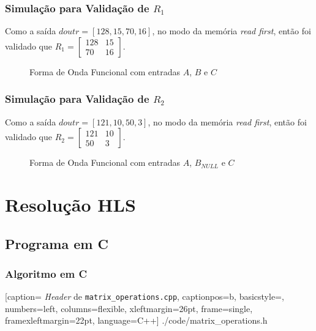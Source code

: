 \documentclass{beamer}
\begin{document}
    \begin{frame}
        \frametitle{Simulação para Validação de $ R_1 $}

        \begingroup {}
            Como a saída $ doutr = [128, 15, 70, 16] $, 
            no modo da memória \textit{read first}, então
            foi validado que $ R_1 = \begin{bmatrix} 128 & 15 \\ 70 & 16 \end{bmatrix} $.
        \endgroup

        \begin{figure}[h] 
            \centering
            \caption{\label{img:pc-po-simulation-1} Forma de Onda Funcional com entradas $ A $, $ B $ e $ C $}
          \end{figure}
    \end{frame}

    \begin{frame}
        \frametitle{Simulação para Validação de $ R_2 $}

        \begingroup {}
            Como a saída $ doutr = [121, 10, 50, 3] $, 
            no modo da memória \textit{read first}, então
            foi validado que $ R_2 = \begin{bmatrix} 121 & 10 \\ 50 & 3 \end{bmatrix} $.
        \endgroup

        \begin{figure}[h] 
            \centering
            \caption{\label{img:pc-po-simulation-2} Forma de Onda Funcional com entradas $ A $, $ B_{NULL} $ e $ C $}
          \end{figure}
    \end{frame}

    \section{Resolução HLS}
    \subsection{Programa em C}
    \begin{frame}[fragile]
        \frametitle{Algoritmo em C}

        
        [caption= \textit{Header} de \texttt{matrix\_operations.cpp},
        captionpos=b,
        basicstyle=\tiny,
        numbers=left,
        columns=flexible,
        xleftmargin=26pt,
        frame=single,
        framexleftmargin=22pt,
        language=C++]
        {./code/matrix_operations.h}
    \end{frame}
\end{document}
